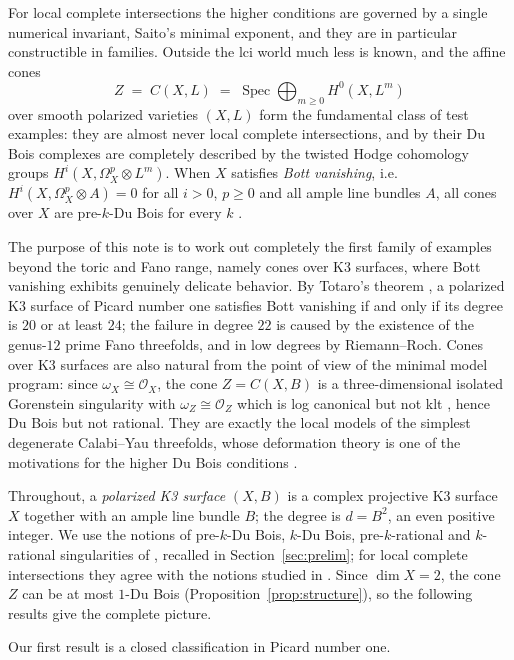 \documentclass[11pt]{amsart}
\numberwithin{equation}{section}
\theoremstyle{plain}
\theoremstyle{definition}
\theoremstyle{remark}
\newcommand{\cO}{\mathcal{O}}
\newcommand{\Spec}{\operatorname{Spec}}
\begin{document}
For local complete intersections the higher conditions are governed by a single numerical invariant, Saito's minimal exponent, and they are in particular constructible in families.
Outside the lci world much less is known, and the affine cones
\[
Z \;=\; C(X,L)\;=\;\Spec \bigoplus_{m\ge 0}H^0(X,L^{m})
\]
over smooth polarized varieties $(X,L)$ form the fundamental class of test examples: they are almost never local complete intersections, and by \cite{SVV,PS} their Du Bois complexes are completely described by the twisted Hodge cohomology groups $H^i(X,\Omega^p_X\otimes L^m)$.
When $X$ satisfies \emph{Bott vanishing}, i.e.\ $H^i(X,\Omega^p_X\otimes A)=0$ for all $i>0$, $p\ge 0$ and all ample line bundles $A$, all cones over $X$ are pre-$k$-Du Bois for every $k$ \cite[Cor.~7.6]{SVV}.

The purpose of this note is to work out completely the first family of examples beyond the toric and Fano range, namely cones over K3 surfaces, where Bott vanishing exhibits genuinely delicate behavior.
By Totaro's theorem \cite{Tot}, a polarized K3 surface of Picard number one satisfies Bott vanishing if and only if its degree is $20$ or at least $24$; the failure in degree $22$ is caused by the existence of the genus-$12$ prime Fano threefolds, and in low degrees by Riemann--Roch.
Cones over K3 surfaces are also natural from the point of view of the minimal model program: since $\omega_X\cong\cO_X$, the cone $Z=C(X,B)$ is a three-dimensional isolated Gorenstein singularity with $\omega_Z\cong\cO_Z$ which is log canonical but not klt \cite[\S3.1]{Kol}, hence Du Bois but not rational.
They are exactly the local models of the simplest degenerate Calabi--Yau threefolds, whose deformation theory is one of the motivations for the higher Du Bois conditions \cite{FLdef}.

Throughout, a \emph{polarized K3 surface} $(X,B)$ is a complex projective K3 surface $X$ together with an ample line bundle $B$; the degree is $d=B^2$, an even positive integer.
We use the notions of pre-$k$-Du Bois, $k$-Du Bois, pre-$k$-rational and $k$-rational singularities of \cite{SVV}, recalled in Section~\ref{sec:prelim}; for local complete intersections they agree with the notions studied in \cite{MOPW,JKSY,MP,CDM,FL}.
Since $\dim X=2$, the cone $Z$ can be at most $1$-Du Bois (Proposition~\ref{prop:structure}), so the following results give the complete picture.

Our first result is a closed classification in Picard number one.
\end{document}
